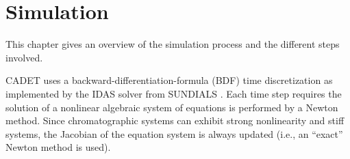 %  
%  

\chapter{Simulation}

This chapter gives an overview of the simulation process and the different steps involved.

CADET uses a backward-differentiation-formula (BDF) time discretization as implemented by the IDAS solver from SUNDIALS \cite{Hindmarsh2005}.
Each time step requires the solution of a nonlinear algebraic system of equations is performed by a Newton method.
Since chromatographic systems can exhibit strong nonlinearity and stiff systems, the Jacobian of the equation system is always updated (i.e., an ``exact'' Newton method is used).

